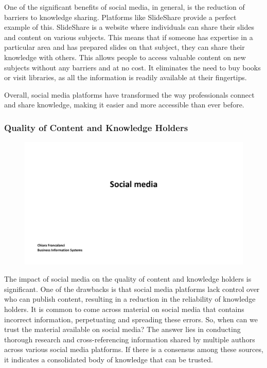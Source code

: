 One of the significant benefits of social media, in general, is the
reduction of barriers to knowledge sharing. Platforms like SlideShare
provide a perfect example of this. SlideShare is a website where
individuals can share their slides and content on various subjects. This
means that if someone has expertise in a particular area and has
prepared slides on that subject, they can share their knowledge with
others. This allows people to access valuable content on new subjects
without any barriers and at no cost. It eliminates the need to buy books
or visit libraries, as all the information is readily available at their
fingertips.

Overall, social media platforms have transformed the way professionals
connect and share knowledge, making it easier and more accessible than
ever before.

\subsubsection{Quality of Content and Knowledge
    Holders}\label{quality-of-content-and-knowledge-holders}

\begin{figure}[!h]
    \centering
    \includegraphics[page=4, trim = 1.5cm 4cm 2cm 4cm, clip, width=\textwidth]{images/04 - Social_Media.pdf}
\end{figure}

The impact of social media on the quality of content and knowledge
holders is significant. One of the drawbacks is that social media
platforms lack control over who can publish content, resulting in a
reduction in the reliability of knowledge holders. It is common to come
across material on social media that contains incorrect information,
perpetuating and spreading these errors. So, when can we trust the
material available on social media? The answer lies in conducting
thorough research and cross-referencing information shared by multiple
authors across various social media platforms. If there is a consensus
among these sources, it indicates a consolidated body of knowledge that
can be trusted.

